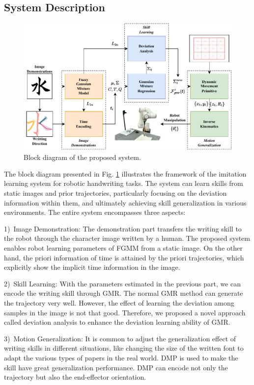 \documentclass[conference]{IEEEtran}
\begin{document}
\subsection{System Description}
\begin{figure}[!t]
    \centering
    \includegraphics[width=6in]{./fig/fig1.pdf}
    \caption{Block diagram of the proposed system.}
    \label{fig1}
\end{figure}
The block diagram presented in Fig. \ref{fig1} illustrates the framework of the imitation learning system for robotic handwriting tasks. The system can learn skills from static images and prior trajectories, particularly focusing on the deviation information within them, and ultimately achieving skill generalization in various environments. The entire system encompasses three aspects:

1)~Image Demonstration: The demonstration part transfers the writing skill to the robot through the character image written by a human. The proposed system enables robot learning parameters of FGMM from a static image. On the other hand, the priori information of time is attained by the priori trajectories, which explicitly show the implicit time information in the image.

2)~Skill Learning: With the parameters estimated in the previous part, we can encode the writing skill through GMR. The normal GMR method can generate the trajectory very well. However, the effect of learning the deviation among samples in the image is not that good. Therefore, we proposed a novel approach called deviation analysis to enhance the deviation learning ability of GMR.

3)~Motion Generalization: It is common to adjust the generalization effect of writing skills in different situations, like changing the size of the written font to adapt the various types of papers in the real world. DMP is used to make the skill have great generalization performance. DMP can encode not only the trajectory but also the end-effector orientation.
\end{document}
